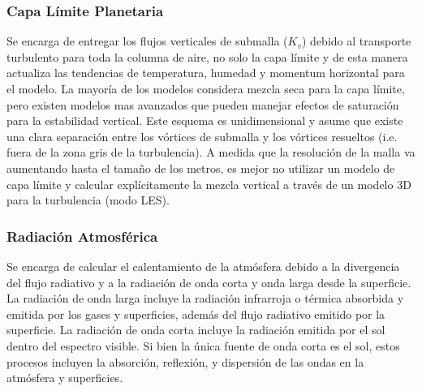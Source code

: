 \subsubsection{Capa Límite Planetaria}
Se encarga de entregar los flujos verticales de submalla ($K_v$) debido al transporte turbulento para toda la columna de aire, no solo la capa límite y de esta manera actualiza las tendencias de temperatura, humedad y momentum horizontal para el modelo. La mayoría de los modelos considera mezcla seca para la capa límite, pero existen modelos mas avanzados que pueden manejar efectos de saturación para la estabilidad vertical. Este esquema es unidimensional y asume que existe una clara separación entre los vórtices de submalla y los vórtices resueltos (i.e. fuera de la zona gris de la turbulencia). A medida que la resolución de la malla va aumentando hasta el tamaño de los metros, es mejor no utilizar un modelo de capa límite y calcular explícitamente la mezcla vertical a través de un modelo 3D para la turbulencia (modo LES).
\subsubsection{Radiación Atmosférica}
Se encarga de calcular el calentamiento de la atmósfera debido a la divergencia del flujo radiativo y a la radiación de onda corta y onda larga desde la superficie. La radiación de onda larga incluye la radiación infrarroja o térmica absorbida y emitida por los gases y superficies, además del flujo radiativo emitido por la superficie. La radiación de onda corta incluye la radiación emitida por el sol dentro del espectro visible. Si bien la única fuente de onda corta es el sol, estos procesos incluyen la absorción, reflexión, y dispersión de las ondas en la atmósfera y superficies.

\newpage
